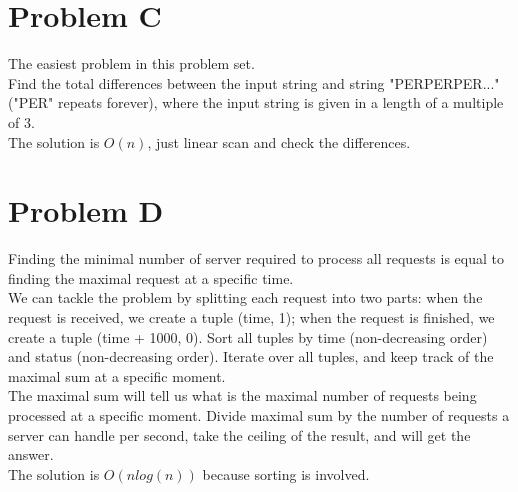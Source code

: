 \documentclass[10pt]{article}
\begin{document}


\newpage



\section*{Problem C}

The easiest problem in this problem set.\\

Find the total differences between the input string and string "PERPERPER..." ("PER" repeats forever), where the input string is given in a length of a multiple of 3.\\

The solution is $O(n)$, just linear scan and check the differences.\\



\newpage



\section*{Problem D}

Finding the minimal number of server required to process all requests is equal to finding the maximal request at a specific time. \\

We can tackle the problem by splitting each request into two parts: when the request is received, we create a tuple (time, 1); when the request is finished, we create a tuple (time + 1000, 0). Sort all tuples by time (non-decreasing order) and status (non-decreasing order). Iterate over all tuples, and keep track of the maximal sum at a specific moment. \\

The maximal sum will tell us what is the maximal number of requests being processed at a specific moment. Divide maximal sum by the number of requests a server can handle per second, take the ceiling of the result, and will get the answer.\\

The solution is $O(nlog(n))$ because sorting is involved.\\


\end{document}
